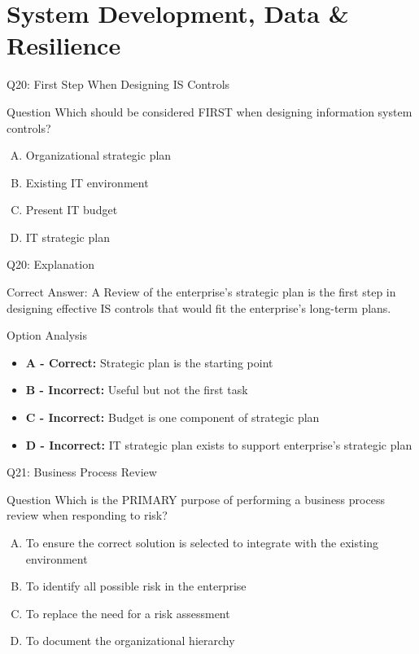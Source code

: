 \documentclass{beamer}
\begin{document}
	
	\section{System Development, Data \& Resilience}
	
	\begin{frame}{Q20: First Step When Designing IS Controls}
		\begin{block}{Question}
			Which should be considered FIRST when designing information system controls?
		\end{block}
		\begin{enumerate}[(A)]
			\item Organizational strategic plan
			\item Existing IT environment
			\item Present IT budget
			\item IT strategic plan
		\end{enumerate}
	\end{frame}
	
	\begin{frame}{Q20: Explanation}
		\begin{block}{Correct Answer: A}
			Review of the enterprise's strategic plan is the first step in designing effective IS controls that would fit the enterprise's long-term plans.
		\end{block}
		\begin{block}{Option Analysis}
			\begin{itemize}
				\item \textbf{A - Correct:} Strategic plan is the starting point
				\item \textbf{B - Incorrect:} Useful but not the first task
				\item \textbf{C - Incorrect:} Budget is one component of strategic plan
				\item \textbf{D - Incorrect:} IT strategic plan exists to support enterprise's strategic plan
			\end{itemize}
		\end{block}
	\end{frame}
	
	\begin{frame}{Q21: Business Process Review}
		\begin{block}{Question}
			Which is the PRIMARY purpose of performing a business process review when responding to risk?
		\end{block}
		\begin{enumerate}[(A)]
			\item To ensure the correct solution is selected to integrate with the existing environment
			\item To identify all possible risk in the enterprise
			\item To replace the need for a risk assessment
			\item To document the organizational hierarchy
		\end{enumerate}
	\end{frame}
	
\end{document}
